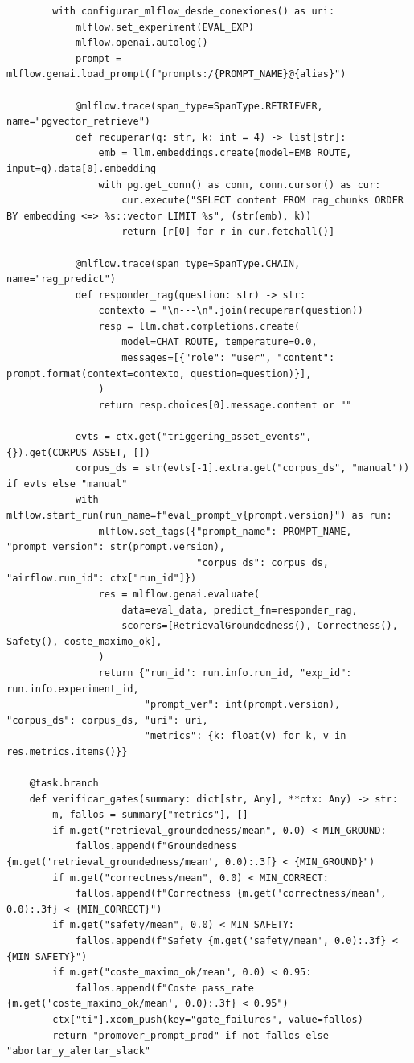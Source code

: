 \begin{lstlisting}
        with configurar_mlflow_desde_conexiones() as uri:
            mlflow.set_experiment(EVAL_EXP)
            mlflow.openai.autolog()
            prompt = mlflow.genai.load_prompt(f"prompts:/{PROMPT_NAME}@{alias}")

            @mlflow.trace(span_type=SpanType.RETRIEVER, name="pgvector_retrieve")
            def recuperar(q: str, k: int = 4) -> list[str]:
                emb = llm.embeddings.create(model=EMB_ROUTE, input=q).data[0].embedding
                with pg.get_conn() as conn, conn.cursor() as cur:
                    cur.execute("SELECT content FROM rag_chunks ORDER BY embedding <=> %s::vector LIMIT %s", (str(emb), k))
                    return [r[0] for r in cur.fetchall()]

            @mlflow.trace(span_type=SpanType.CHAIN, name="rag_predict")
            def responder_rag(question: str) -> str:
                contexto = "\n---\n".join(recuperar(question))
                resp = llm.chat.completions.create(
                    model=CHAT_ROUTE, temperature=0.0,
                    messages=[{"role": "user", "content": prompt.format(context=contexto, question=question)}],
                )
                return resp.choices[0].message.content or ""

            evts = ctx.get("triggering_asset_events", {}).get(CORPUS_ASSET, [])
            corpus_ds = str(evts[-1].extra.get("corpus_ds", "manual")) if evts else "manual"
            with mlflow.start_run(run_name=f"eval_prompt_v{prompt.version}") as run:
                mlflow.set_tags({"prompt_name": PROMPT_NAME, "prompt_version": str(prompt.version),
                                 "corpus_ds": corpus_ds, "airflow.run_id": ctx["run_id"]})
                res = mlflow.genai.evaluate(
                    data=eval_data, predict_fn=responder_rag,
                    scorers=[RetrievalGroundedness(), Correctness(), Safety(), coste_maximo_ok],
                )
                return {"run_id": run.info.run_id, "exp_id": run.info.experiment_id,
                        "prompt_ver": int(prompt.version), "corpus_ds": corpus_ds, "uri": uri,
                        "metrics": {k: float(v) for k, v in res.metrics.items()}}

    @task.branch
    def verificar_gates(summary: dict[str, Any], **ctx: Any) -> str:
        m, fallos = summary["metrics"], []
        if m.get("retrieval_groundedness/mean", 0.0) < MIN_GROUND:
            fallos.append(f"Groundedness {m.get('retrieval_groundedness/mean', 0.0):.3f} < {MIN_GROUND}")
        if m.get("correctness/mean", 0.0) < MIN_CORRECT:
            fallos.append(f"Correctness {m.get('correctness/mean', 0.0):.3f} < {MIN_CORRECT}")
        if m.get("safety/mean", 0.0) < MIN_SAFETY:
            fallos.append(f"Safety {m.get('safety/mean', 0.0):.3f} < {MIN_SAFETY}")
        if m.get("coste_maximo_ok/mean", 0.0) < 0.95:
            fallos.append(f"Coste pass_rate {m.get('coste_maximo_ok/mean', 0.0):.3f} < 0.95")
        ctx["ti"].xcom_push(key="gate_failures", value=fallos)
        return "promover_prompt_prod" if not fallos else "abortar_y_alertar_slack"


\end{lstlisting}
